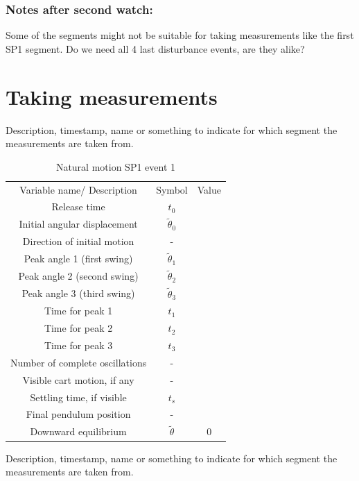 \subsubsection{Notes after second watch:}
Some of the segments might not be suitable for taking measurements like the first SP1 segment. Do we need all 4 last disturbance events, are they alike?



\section{Taking measurements}
Description, timestamp, name or something to indicate for which segment the measurements are taken from.
\begin{table}
    \centering
    \begin{tabular}{ccc}
           Variable name/ Description& Symbol &Value\\
           Release time&  $t_0$&\\
           Initial angular displacement&   $\tilde\theta_0$&\\
           Direction of initial motion&  -&\\
           Peak angle 1 (first swing)&  $\tilde\theta_1$&\\
           Peak angle 2 (second swing)&  $\tilde\theta_2$&\\
           Peak angle 3 (third swing)&  $\tilde\theta_3$&\\
 Time for peak 1& $t_1$&\\
 Time for peak 2& $t_2$&\\
 Time for peak 3& $t_3$&\\
 Number of complete oscillations& -&\\
 Visible cart motion, if any& -&\\
 Settling time, if visible& $t_s$&\\
 Final pendulum position& -&\\
 Downward equilibrium& $\tilde\theta$&0\\
    \end{tabular}
    \caption{Natural motion SP1 event 1}
    \label{tab:placeholder}
\end{table}
Description, timestamp, name or something to indicate for which segment the measurements are taken from.
